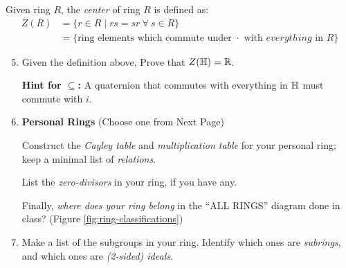 \begin{definition}   
    Given ring $R$, the \textit{center} of ring $R$ is defined as:
    \begin{align*}
        Z(R) &= \{ r \in R \mid rs = sr \ \forall \ s \in R \} \\
        &= \text{\{ring elements which commute under } \cdot \text{ with }everything \text{ in } R \}
    \end{align*}
\end{definition}
\begin{enumerate}
    \setcounter{enumi}{4}
    \item Given the definition above, Prove that $ Z({\mathbb{H}}) = \mathbb{R} $.  \\ \steezybreak

    \textbf{Hint for $ \subseteq $:} A quaternion that commutes with everything in $ {\mathbb{H}} $ must commute with $ i $.  \\ \steezybreak
\end{enumerate}

\begin{enumerate}
    \setcounter{enumi}{5} %

    \item \textbf{Personal Rings} (Choose one from Next Page) 

    Construct the \textit{Cayley table} and \textit{multiplication table} for your personal ring;  
    keep a minimal list of \textit{relations}.  \\ \steezybreak

    List the \textit{zero-divisors} in your ring, if you have any.  \\ \steezybreak

    Finally, \textit{where does your ring belong} in the ``ALL RINGS'' diagram done in class? (Figure \ref{fig:ring-classifications}) \\ \steezybreak


    \item Make a list of the subgroups in your ring.  
    Identify which ones are \textit{subrings}, and which ones are \textit{(2-sided) ideals}.
\end{enumerate}
\newpage
